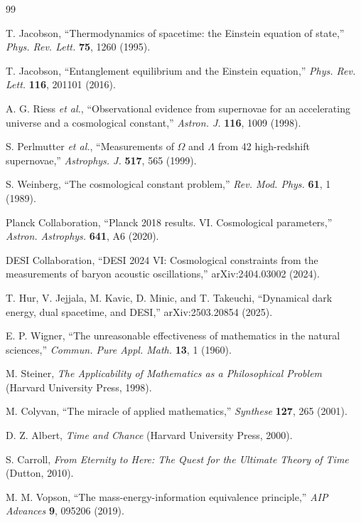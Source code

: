 \documentclass[11pt,a4paper]{article}
\begin{document}
\begin{thebibliography}{99}

T. Jacobson, ``Thermodynamics of spacetime: the Einstein equation of state,'' \textit{Phys. Rev. Lett.} \textbf{75}, 1260 (1995).

T. Jacobson, ``Entanglement equilibrium and the Einstein equation,'' \textit{Phys. Rev. Lett.} \textbf{116}, 201101 (2016).

A. G. Riess \textit{et al.}, ``Observational evidence from supernovae for an accelerating universe and a cosmological constant,'' \textit{Astron. J.} \textbf{116}, 1009 (1998).

S. Perlmutter \textit{et al.}, ``Measurements of $\Omega$ and $\Lambda$ from 42 high-redshift supernovae,'' \textit{Astrophys. J.} \textbf{517}, 565 (1999).

S. Weinberg, ``The cosmological constant problem,'' \textit{Rev. Mod. Phys.} \textbf{61}, 1 (1989).

Planck Collaboration, ``Planck 2018 results. VI. Cosmological parameters,'' \textit{Astron. Astrophys.} \textbf{641}, A6 (2020).

DESI Collaboration, ``DESI 2024 VI: Cosmological constraints from the measurements of baryon acoustic oscillations,'' arXiv:2404.03002 (2024).

T. Hur, V. Jejjala, M. Kavic, D. Minic, and T. Takeuchi, ``Dynamical dark energy, dual spacetime, and DESI,'' arXiv:2503.20854 (2025).

E. P. Wigner, ``The unreasonable effectiveness of mathematics in the natural sciences,'' \textit{Commun. Pure Appl. Math.} \textbf{13}, 1 (1960).

M. Steiner, \textit{The Applicability of Mathematics as a Philosophical Problem} (Harvard University Press, 1998).

M. Colyvan, ``The miracle of applied mathematics,'' \textit{Synthese} \textbf{127}, 265 (2001).

D. Z. Albert, \textit{Time and Chance} (Harvard University Press, 2000).

S. Carroll, \textit{From Eternity to Here: The Quest for the Ultimate Theory of Time} (Dutton, 2010).

M. M. Vopson, ``The mass-energy-information equivalence principle,'' \textit{AIP Advances} \textbf{9}, 095206 (2019).


\end{thebibliography}
\end{document}
